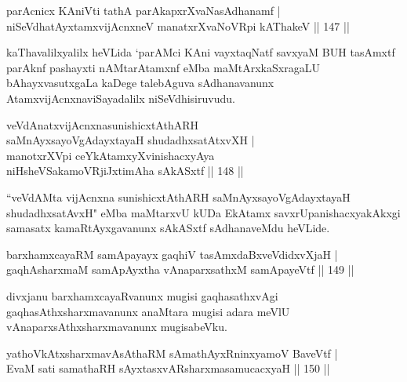 \begin{shl}
parAcnicx KAniVti tathA parAkapxrXvaNasAdhanamf |\\
niSeVdhatAyxtamxvijAcnxneV manatxrXvaNoVR\s pi kAThakeV \hfill || 147 ||
\end{shl}

\begin{artha}
kaThavalilxyalilx heVLida `parAMci KAni vayxtaqNatf savxyaM BUH tasAmxtf parAknf pashayxti nAMtarAtamxnf eMba maMtArxkaSxragaLU bAhayxvasutxgaLa kaDege talebAguva sAdhanavanunx AtamxvijAcnxnaviSayadalilx niSeVdhisiruvudu.
\end{artha}


\begin{shl}
veVdAnatxvijAcnxnasunishicxtAthARH \\
saMnAyxsayoVgAdayxtayaH shudadhxsatAtxvXH |\\
manotxrXV\s pi ceYkAtamxyXvinishacxyAya \\
niHsheVSakamoVRjiJxtimAha sAkASxtf \hfill || 148 ||
\end{shl}

\begin{artha}
``veVdAMta vijAcnxna sunishicxtAthARH saMnAyxsayoVgAdayxtayaH shudadhxsatAvxH" eMba maMtarxvU kUDa EkAtamx savxrUpanishacxyakAkxgi samasatx kamaRtAyxgavanunx sAkASxtf sAdhanaveMdu heVLide.
\end{artha}


\begin{shl}
barxhamxcayaRM samApayayx gaqhiV tasAmxdaBxveVdidxvXjaH |\\
gaqhAsharxmaM samApAyxtha vAnaparxsathxM samApayeVtf \hfill || 149 ||
\end{shl}

\begin{artha}
divxjanu barxhamxcayaRvanunx mugisi gaqhasathxvAgi gaqhasAthxsharxmavanunx anaMtara mugisi adara meVlU vAnaparxsAthxsharxmavanunx mugisabeVku.
\end{artha}


\begin{shl}
yathoVkAtxsharxmavAsAthaRM sAmathAyxRninxyamoV BaveVtf |\\
EvaM sati samathaRH sAyxtasxvARsharxmasamucacxyaH \hfill || 150 ||
\end{shl}

